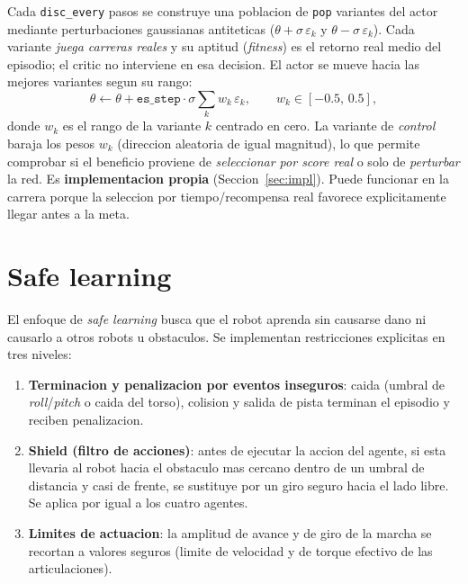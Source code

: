 \documentclass[conference]{IEEEtran}
\begin{document}
Cada \texttt{disc\_every} pasos se construye una poblacion de \texttt{pop}
variantes del actor mediante perturbaciones gaussianas antiteticas
($\theta + \sigma\,\varepsilon_k$ y $\theta - \sigma\,\varepsilon_k$). Cada
variante \emph{juega carreras reales} y su aptitud (\emph{fitness}) es el
retorno real medio del episodio; el critic no interviene en esa decision. El
actor se mueve hacia las mejores variantes segun su rango:
\begin{equation}
\theta \leftarrow \theta + \texttt{es\_step}\cdot\sigma \sum_{k} w_k\,\varepsilon_k,
\qquad w_k \in [-0.5,\,0.5],
\end{equation}
donde $w_k$ es el rango de la variante $k$ centrado en cero. La variante de
\emph{control} baraja los pesos $w_k$ (direccion aleatoria de igual magnitud),
lo que permite comprobar si el beneficio proviene de \emph{seleccionar por score
real} o solo de \emph{perturbar} la red. Es \textbf{implementacion propia}
(Seccion~\ref{sec:impl}). Puede funcionar en la carrera porque la seleccion por
tiempo/recompensa real favorece explicitamente llegar antes a la meta.

\section{Safe learning}
El enfoque de \emph{safe learning} busca que el robot aprenda sin causarse dano
ni causarlo a otros robots u obstaculos. Se implementan restricciones explicitas
en tres niveles:

\begin{enumerate}
  \item \textbf{Terminacion y penalizacion por eventos inseguros}: caida (umbral
  de \emph{roll}/\emph{pitch} o caida del torso), colision y salida de pista
  terminan el episodio y reciben penalizacion.
  \item \textbf{Shield (filtro de acciones)}: antes de ejecutar la accion del
  agente, si esta llevaria al robot hacia el obstaculo mas cercano dentro de un
  umbral de distancia y casi de frente, se sustituye por un giro seguro hacia el
  lado libre. Se aplica por igual a los cuatro agentes.
  \item \textbf{Limites de actuacion}: la amplitud de avance y de giro de la
  marcha se recortan a valores seguros (limite de velocidad y de torque efectivo
  de las articulaciones).
\end{enumerate}
\end{document}
